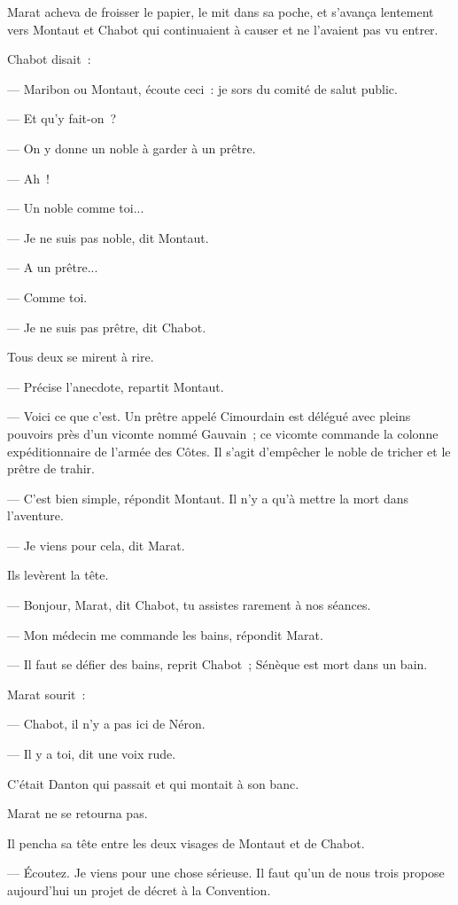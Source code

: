\documentclass[french,twoside]{book} %
\begin{document}
Marat acheva de froisser le papier, le mit dans sa poche, et s’avança lentement vers Montaut et Chabot qui continuaient à causer et ne l’avaient pas vu entrer.\par
Chabot disait :\par
— Maribon ou Montaut, écoute ceci : je sors du comité de salut public.\par
— Et qu’y fait-on ?\par
— On y donne un noble à garder à un prêtre.\par
— Ah !\par
— Un noble comme toi...\par
— Je ne suis pas noble, dit Montaut.\par
— A un prêtre...\par
— Comme toi.\par
— Je ne suis pas prêtre, dit Chabot.\par
 Tous deux se mirent à rire.\par
— Précise l’anecdote, repartit Montaut.\par
— Voici ce que c’est. Un prêtre appelé Cimourdain est délégué avec pleins pouvoirs près d’un vicomte nommé Gauvain ; ce vicomte commande la colonne expéditionnaire de l’armée des Côtes. Il s’agit d’empêcher le noble de tricher et le prêtre de trahir.\par
— C’est bien simple, répondit Montaut. Il n’y a qu’à mettre la mort dans l’aventure.\par
— Je viens pour cela, dit Marat.\par
Ils levèrent la tête.\par
— Bonjour, Marat, dit Chabot, tu assistes rarement à nos séances.\par
— Mon médecin me commande les bains, répondit Marat.\par
— Il faut se défier des bains, reprit Chabot ; Sénèque est mort dans un bain.\par
Marat sourit :\par
— Chabot, il n’y a pas ici de Néron.\par
— Il y a toi, dit une voix rude.\par
C’était Danton qui passait et qui montait à son banc.\par
Marat ne se retourna pas.\par
Il pencha sa tête entre les deux visages de Montaut et de Chabot.\par
— Écoutez. Je viens pour une chose sérieuse. Il faut qu’un de nous trois propose aujourd’hui un projet de décret à la Convention.\par
\end{document}
